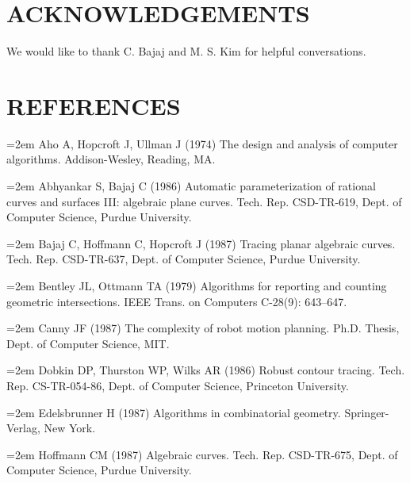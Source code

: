 \SingleSpace
\section*{ACKNOWLEDGEMENTS}
We would like to thank C. Bajaj and M. S. Kim for helpful conversations.

\section*{REFERENCES}


\parskip=0pt
\parindent=20pt
\hangindent=2em  %
Aho A, Hopcroft J, Ullman J (1974)
The design and analysis of computer algorithms.
Addison-Wesley, Reading, MA.

\hangindent=2em  %
\noindent 
Abhyankar S, Bajaj C (1986)
Automatic parameterization of rational curves and surfaces III:
algebraic plane curves.
Tech. Rep. CSD-TR-619, Dept. of Computer Science, Purdue University.

\hangindent=2em  %
\noindent 
Bajaj C, Hoffmann C, Hopcroft J (1987)
Tracing planar algebraic curves.
Tech. Rep. \mbox{CSD-TR-637}, Dept. of Computer Science, Purdue University.

\hangindent=2em  %
\noindent 
Bentley JL, Ottmann TA (1979)
Algorithms for reporting and counting geometric intersections.
IEEE Trans. on Computers C-28(9): 643--647.

\hangindent=2em  %
\noindent 
Canny JF (1987) The complexity of robot motion planning.
Ph.D. Thesis, Dept. of Computer Science, MIT.

\hangindent=2em  %
\noindent 
Dobkin DP, Thurston WP, Wilks AR (1986)
Robust contour tracing.
Tech. Rep. CS-TR-054-86, Dept. of Computer Science, Princeton University.

\hangindent=2em  %
\noindent 
Edelsbrunner H (1987) Algorithms in combinatorial geometry.
Springer-Verlag, New York.

\hangindent=2em  %
\noindent 
Hoffmann CM (1987) 
Algebraic curves.
Tech. Rep. CSD-TR-675, Dept. of Computer Science, Purdue University.

